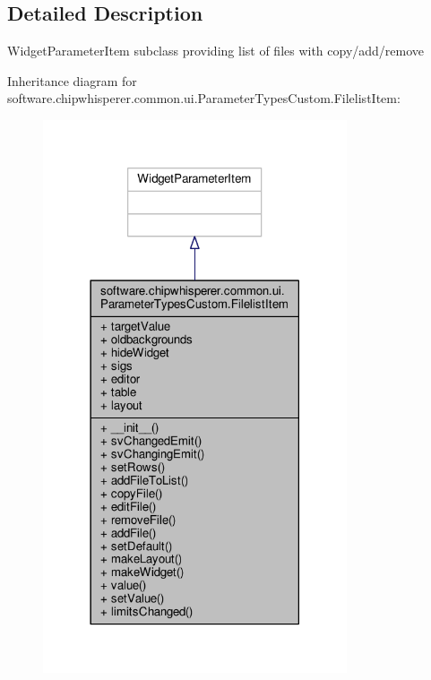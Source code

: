 \subsection{Detailed Description}
\begin{DoxyVerb}WidgetParameterItem subclass providing list of files with copy/add/remove
\end{DoxyVerb}
 

Inheritance diagram for software.\+chipwhisperer.\+common.\+ui.\+Parameter\+Types\+Custom.\+Filelist\+Item\+:\nopagebreak
\begin{figure}[H]
\begin{center}
\leavevmode
\includegraphics[width=254pt]{db/daf/classsoftware_1_1chipwhisperer_1_1common_1_1ui_1_1ParameterTypesCustom_1_1FilelistItem__inherit__graph}
\end{center}
\end{figure}


